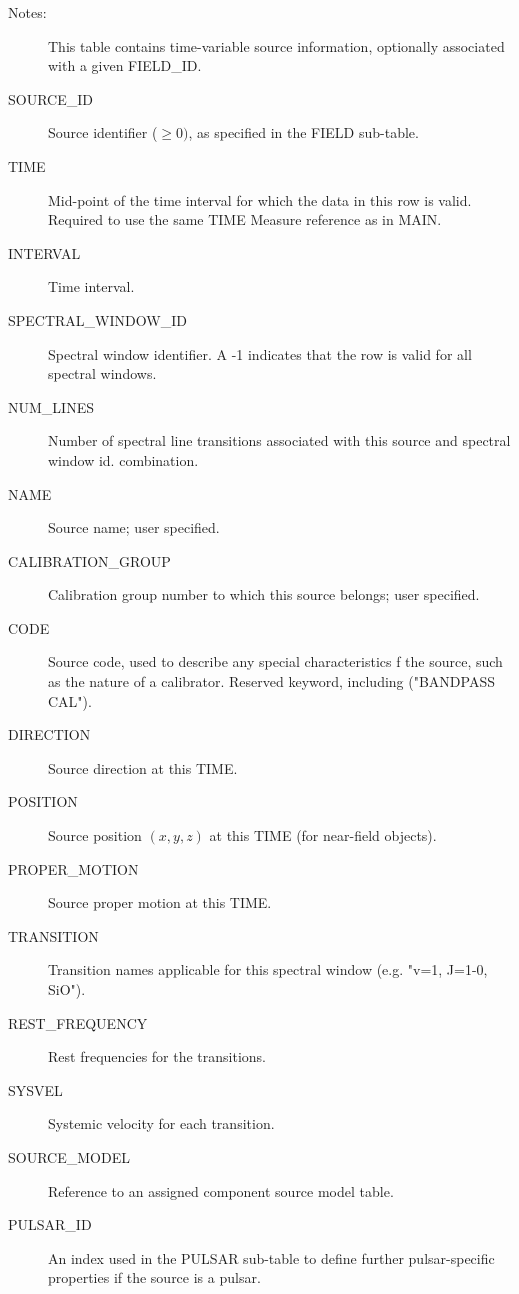 \documentclass{article}
\begin{document}
\begin{description}

\item[Notes:] This table contains time-variable source information,
optionally associated with a given FIELD\_ID.

\item[SOURCE\_ID] Source identifier ($\geq 0)$, as specified in the
FIELD sub-table.

\item[TIME] Mid-point of the time interval for which the data in this
row is valid. Required to use the same TIME Measure reference as in
MAIN.

\item[INTERVAL] Time interval.

\item[SPECTRAL\_WINDOW\_ID] Spectral window identifier. A -1 indicates
that the row is valid for all spectral windows.

\item[NUM\_LINES] Number of spectral line transitions associated with
this source and spectral window id. combination.

\item[NAME] Source name; user specified.

\item[CALIBRATION\_GROUP] Calibration group number to which this source
belongs; user specified.

\item[CODE] Source code, used to describe any special characteristics
f the source, such as the nature of a calibrator. Reserved keyword,
including ("BANDPASS CAL").

\item[DIRECTION] Source direction at this TIME.

\item[POSITION] Source position $(x,y,z)$ at this TIME (for near-field
objects).

\item[PROPER\_MOTION] Source proper motion at this TIME.

\item[TRANSITION] Transition names applicable for this spectral window
(e.g. "v=1, J=1-0, SiO").

\item[REST\_FREQUENCY] Rest frequencies for the transitions.

\item[SYSVEL] Systemic velocity for each transition.

\item[SOURCE\_MODEL] Reference to an assigned component source model
table.

\item[PULSAR\_ID] An index used in the PULSAR sub-table to define
further pulsar-specific properties if the source is a pulsar.

\end{description}
\end{document}
